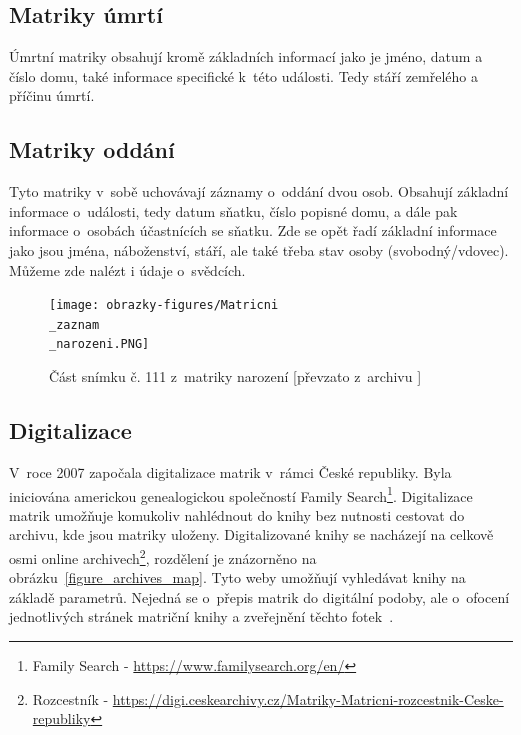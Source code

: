 \subsection{Matriky úmrtí}
Úmrtní matriky obsahují kromě základních informací jako je jméno, datum a číslo domu, také informace specifické k~této události. Tedy stáří zemřelého a příčinu úmrtí.

\subsection{Matriky oddání}
Tyto matriky v~sobě uchovávají záznamy o~oddání dvou osob. Obsahují základní informace o~události, tedy datum sňatku, číslo popisné domu, a dále pak informace o~osobách účastnících se sňatku. Zde se opět řadí základní informace jako jsou jména, náboženství, stáří, ale také třeba stav osoby (svobodný/vdovec). Můžeme zde nalézt i údaje o~svědcích.

\begin{figure}[H]
	\centering
	\texttt{[image: obrazky-figures/Matricni\\\_zaznam\\\_narozeni.PNG]}
	\caption[Matriční záznam]{Část snímku č. 111 z~matriky narození [převzato z~archivu \cite{snimek}]}
	\label{figure_birth_parishbook}
\end{figure}

\subsection{Digitalizace}
V~roce 2007 započala digitalizace matrik v~rámci České republiky. Byla iniciována americkou genealogickou společností Family Search\footnote{Family Search - \url{https://www.familysearch.org/en/}}. Digitalizace matrik umožňuje komukoliv nahlédnout do knihy bez nutnosti cestovat do archivu, kde jsou matriky uloženy. Digitalizované knihy se nacházejí na celkově osmi online archivech\footnote{Rozcestník - \url{https://digi.ceskearchivy.cz/Matriky-Matricni-rozcestnik-Ceske-republiky}}, rozdělení je znázorněno na obrázku~\ref{figure_archives_map}. Tyto weby umožňují vyhledávat knihy na základě parametrů. Nejedná se o~přepis matrik do digitální podoby, ale o~ofocení jednotlivých stránek matriční knihy a zveřejnění těchto fotek~\cite{digitalizaceMatrik}.

